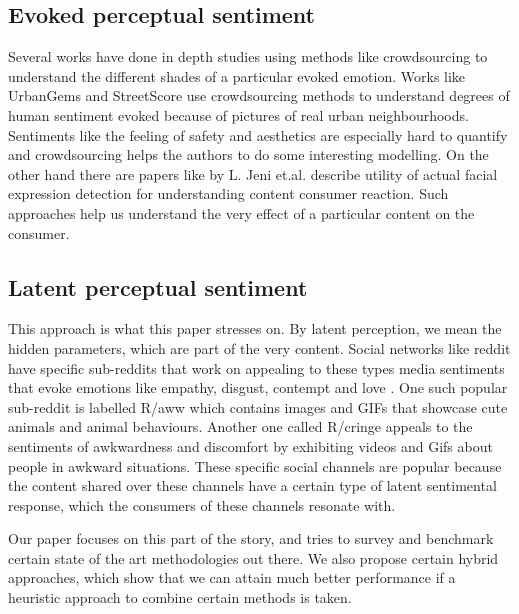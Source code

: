 \subsection{ Evoked perceptual sentiment }
Several works have done in depth studies using methods like crowdsourcing to understand the different shades of a particular evoked emotion. Works like UrbanGems \cite{urbanGems} and StreetScore \cite{nikhil} use crowdsourcing methods to understand degrees of human sentiment evoked because of pictures of real urban neighbourhoods. Sentiments like the feeling of safety and aesthetics are especially hard to quantify and crowdsourcing helps the authors to do some interesting modelling. On the other hand there are papers like \cite{jeni20123d} by L. Jeni et.al. describe utility of actual facial expression detection for understanding content consumer reaction. Such approaches help us understand the very effect of a particular content on the consumer. 

\subsection{ Latent perceptual sentiment }
This approach is what this paper stresses on. By latent perception, we mean the hidden parameters, which are part of the very content. Social networks like reddit have specific sub-reddits that work on appealing to these types media sentiments that evoke emotions like empathy, disgust, contempt and love . One such popular sub-reddit is labelled R/aww which contains images and GIFs that showcase cute animals and animal behaviours. Another one called R/cringe appeals to the sentiments of awkwardness and discomfort by exhibiting videos and Gifs about people in awkward situations. These specific social channels are popular because the content shared over these channels have a certain type of latent sentimental response, which the consumers of these channels resonate with.
\par
Our paper focuses on this part of the story, and tries to survey and benchmark certain state of the art methodologies out there. We also propose certain hybrid approaches, which show that we can attain much better performance if a heuristic approach to combine certain methods is taken. 